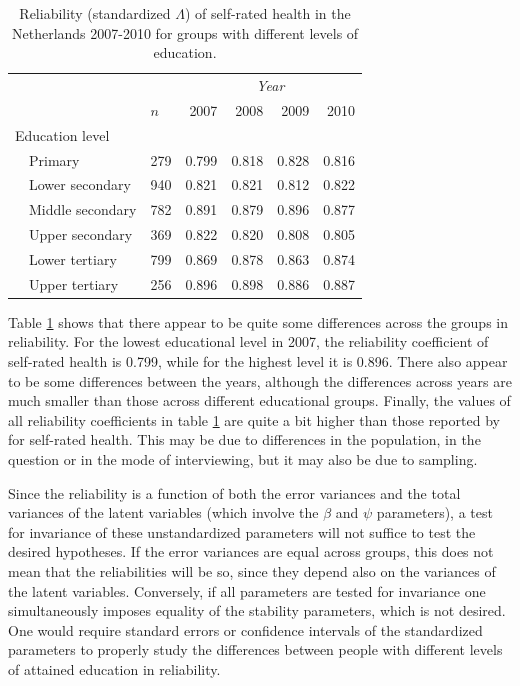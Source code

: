 \documentclass[a4paper, 11pt]{article}
\newcommand{\0}{\boldsymbol{0}}
\begin{document}
\begin{table}[bth]
\begin{center}\begin{small}
\begin{tabular}{lllrrrr}  \hline  \hline
&&&  \multicolumn{4}{c}{\emph{Year}}\\\cline{4-7}
&&$n$& 2007&2008&2009&2010\\
  \hline
  \multicolumn{2}{l}{Education level}\\
& Primary	   & 279  & 0.799 & 0.818 & 0.828 & 0.816 \\ 
& Lower secondary  & 940  & 0.821 & 0.821 & 0.812 & 0.822 \\ 
& Middle secondary & 782  & 0.891 & 0.879 & 0.896 & 0.877 \\ 
& Upper secondary  & 369  & 0.822 & 0.820 & 0.808 & 0.805 \\ 
& Lower tertiary   & 799  & 0.869 & 0.878 & 0.863 & 0.874 \\ 
& Upper tertiary   & 256  & 0.896 & 0.898 & 0.886 & 0.887 \\ 
  \hline     \hline
\end{tabular}
\caption{Reliability (standardized $\Lambda$) of self-rated health in the Netherlands 2007-2010 for groups with different levels of education.}\label{tab:first-results}\end{small}
\end{center}
\end{table}

Table \ref{tab:first-results} shows that there appear to be quite some differences across the groups in reliability. 
For the lowest educational level in 2007, the reliability coefficient of self-rated health is 0.799, while for the highest level it is 0.896.
There also appear to be some differences between the years, although the differences across years are much smaller than those across
different educational groups. Finally, the values of all reliability coefficients in table \ref{tab:first-results} are quite a bit higher than those reported by \cite{lundberg1996assessing} 
for self-rated health. This may be due to differences in the population, in the question or in the mode of interviewing, but it may also be due to sampling. 

Since the reliability is a function of both the error variances and the total variances of the latent variables (which involve the 
$\beta$ and $\psi$ parameters), a test for invariance of these unstandardized parameters will not suffice to test the desired hypotheses. 
If the error variances are equal across groups, this does not mean that the reliabilities will be so, since they depend also on the
variances of the latent variables. Conversely, if all parameters are tested for invariance one simultaneously imposes equality of the
stability parameters, which is not desired.
One would require standard errors or confidence intervals of the standardized parameters to properly study the differences between people with different levels of attained education in reliability.
\end{document}

